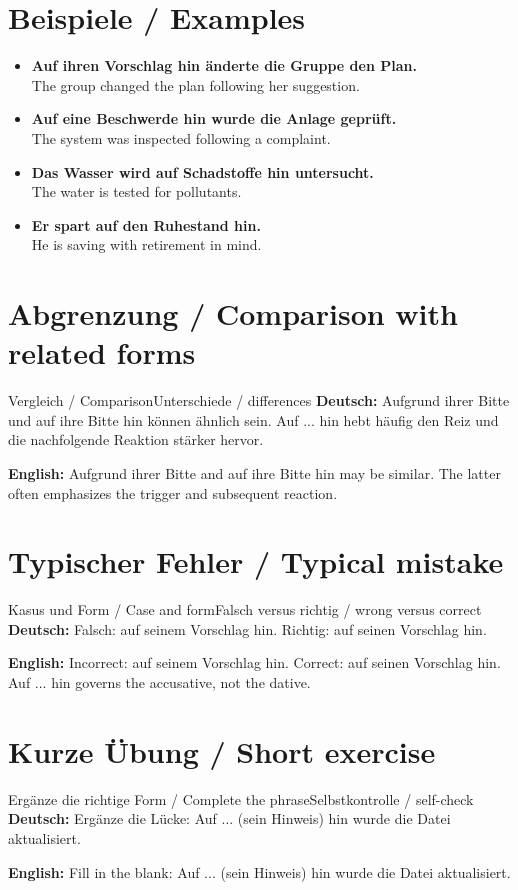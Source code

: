 \documentclass[a4paper,11pt]{article}
\newcommand{\GermanText}[1]{\textbf{Deutsch: }#1\par}
\newcommand{\EnglishText}[1]{{\small\color{SoftGray}\textbf{English: }#1\par}}
\newcommand{\ExampleItem}[2]{\item \textbf{#1}\\{\small\color{SoftGray}#2}}
\begin{document}
\section{Beispiele / Examples}
\begin{exbox}
\begin{itemize}
\ExampleItem{Auf ihren Vorschlag hin änderte die Gruppe den Plan.}{The group changed the plan following her suggestion.}
\ExampleItem{Auf eine Beschwerde hin wurde die Anlage geprüft.}{The system was inspected following a complaint.}
\ExampleItem{Das Wasser wird auf Schadstoffe hin untersucht.}{The water is tested for pollutants.}
\ExampleItem{Er spart auf den Ruhestand hin.}{He is saving with retirement in mind.}
\end{itemize}
\end{exbox}
\section{Abgrenzung / Comparison with related forms}
\begin{grammarentry}{Vergleich / Comparison}{Unterschiede / differences}
\GermanText{Aufgrund ihrer Bitte und auf ihre Bitte hin können ähnlich sein. Auf ... hin hebt häufig den Reiz und die nachfolgende Reaktion stärker hervor.}
\EnglishText{Aufgrund ihrer Bitte and auf ihre Bitte hin may be similar. The latter often emphasizes the trigger and subsequent reaction.}
\end{grammarentry}
\section{Typischer Fehler / Typical mistake}
\begin{grammarentry}{Kasus und Form / Case and form}{Falsch versus richtig / wrong versus correct}
\GermanText{Falsch: auf seinem Vorschlag hin. Richtig: auf seinen Vorschlag hin.}
\EnglishText{Incorrect: auf seinem Vorschlag hin. Correct: auf seinen Vorschlag hin. Auf ... hin governs the accusative, not the dative.}
\end{grammarentry}
\section{Kurze Übung / Short exercise}
\begin{grammarentry}{Ergänze die richtige Form / Complete the phrase}{Selbstkontrolle / self-check}
\GermanText{Ergänze die Lücke: Auf ... (sein Hinweis) hin wurde die Datei aktualisiert.}
\EnglishText{Fill in the blank: Auf ... (sein Hinweis) hin wurde die Datei aktualisiert.}
\end{grammarentry}
\end{document}
